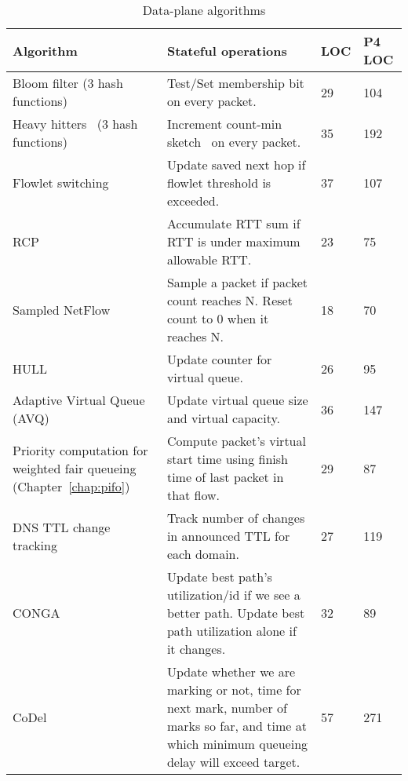 \begin{table}[!t]
\begin{small}
  \begin{tabular}{|p{}|p{}|p{}|p{}|}
\hline
Algorithm & Stateful operations & LOC & P4 LOC\\
\hline
Bloom filter (3 hash functions) & Test/Set membership bit on every packet. & 29 & 104 \\
\hline
Heavy hitters~\cite{opensketch} (3 hash functions) & Increment count-min sketch~\cite{cormode} on every packet. & 35 & 192 \\
\hline
Flowlet switching~\cite{flowlets} & Update saved next hop if flowlet threshold is exceeded.& 37 & 107 \\
\hline
RCP~\cite{rcp} & Accumulate RTT sum if RTT is under maximum allowable RTT. & 23 & 75 \\
\hline
Sampled NetFlow~\cite{sampled_nflow} & Sample a packet if packet count reaches N. Reset count to 0 when it reaches N. & 18 & 70 \\
\hline
HULL~\cite{hull} & Update counter for virtual queue. & 26 & 95 \\
\hline
Adaptive Virtual Queue (AVQ)~\cite{avq} & Update virtual queue size and virtual capacity. & 36 & 147 \\
\hline
Priority computation for weighted fair queueing (Chapter~\ref{chap:pifo}) & Compute packet's virtual start time using finish time of last packet in that flow. & 29 & 87 \\
\hline
DNS TTL change tracking~\cite{dns_change} & Track number of changes in announced TTL for each domain. & 27 & 119 \\
\hline
CONGA~\cite{conga} & Update best path's utilization/id if we see a better path. Update best path utilization alone if it changes.  & 32 & 89\\
\hline
CoDel~\cite{codel} & Update whether we are marking or not, time for next mark, number of marks so far, and time at which minimum queueing delay will exceed target. & 57 & 271\\
\hline
\end{tabular}
\end{small}
\caption{Data-plane algorithms}
\label{tab:algorithms}
\end{table}
